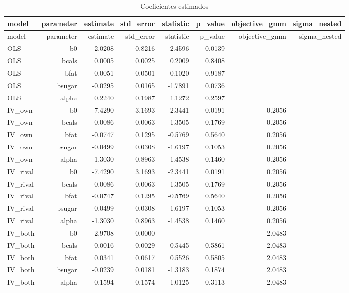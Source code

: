 \begingroup
\scriptsize
\begin{longtable}{@{}lrrrrrrr@{}}
\caption{Coeficientes estimados}\label{tab:all-coef}\\
\toprule
model & parameter & estimate & std\_error & statistic & p\_value & objective\_gmm & sigma\_nested \\
\midrule
\endfirsthead
\toprule
model & parameter & estimate & std\_error & statistic & p\_value & objective\_gmm & sigma\_nested \\
\midrule
\endhead
OLS & b0 & -2.0208 & 0.8216 & -2.4596 & 0.0139 &  &  \\
OLS & bcals & 0.0005 & 0.0025 & 0.2009 & 0.8408 &  &  \\
OLS & bfat & -0.0051 & 0.0501 & -0.1020 & 0.9187 &  &  \\
OLS & bsugar & -0.0295 & 0.0165 & -1.7891 & 0.0736 &  &  \\
OLS & alpha & 0.2240 & 0.1987 & 1.1272 & 0.2597 &  &  \\
IV\_own & b0 & -7.4290 & 3.1693 & -2.3441 & 0.0191 & 0.2056 &  \\
IV\_own & bcals & 0.0086 & 0.0063 & 1.3505 & 0.1769 & 0.2056 &  \\
IV\_own & bfat & -0.0747 & 0.1295 & -0.5769 & 0.5640 & 0.2056 &  \\
IV\_own & bsugar & -0.0499 & 0.0308 & -1.6197 & 0.1053 & 0.2056 &  \\
IV\_own & alpha & -1.3030 & 0.8963 & -1.4538 & 0.1460 & 0.2056 &  \\
IV\_rival & b0 & -7.4290 & 3.1693 & -2.3441 & 0.0191 & 0.2056 &  \\
IV\_rival & bcals & 0.0086 & 0.0063 & 1.3505 & 0.1769 & 0.2056 &  \\
IV\_rival & bfat & -0.0747 & 0.1295 & -0.5769 & 0.5640 & 0.2056 &  \\
IV\_rival & bsugar & -0.0499 & 0.0308 & -1.6197 & 0.1053 & 0.2056 &  \\
IV\_rival & alpha & -1.3030 & 0.8963 & -1.4538 & 0.1460 & 0.2056 &  \\
IV\_both & b0 & -2.9708 & 0.0000 &  &  & 2.0483 &  \\
IV\_both & bcals & -0.0016 & 0.0029 & -0.5445 & 0.5861 & 2.0483 &  \\
IV\_both & bfat & 0.0341 & 0.0617 & 0.5526 & 0.5805 & 2.0483 &  \\
IV\_both & bsugar & -0.0239 & 0.0181 & -1.3183 & 0.1874 & 2.0483 &  \\
IV\_both & alpha & -0.1594 & 0.1574 & -1.0125 & 0.3113 & 2.0483 &  \\

\end{longtable}
